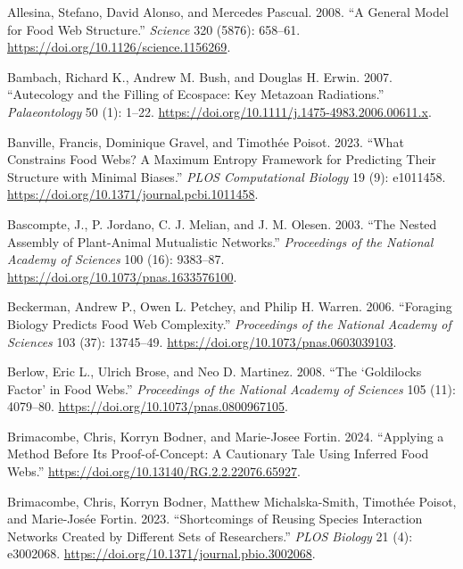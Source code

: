 \documentclass[
  letterpaper,
  DIV=11,
  numbers=noendperiod]{scrartcl}
\newlength{\cslhangindent}
\newenvironment{CSLReferences}[2] %
 {\begin{list}{}{%
  \setlength{\itemindent}{0pt}
  \setlength{\leftmargin}{0pt}
  \setlength{\parsep}{0pt}
  \ifodd #1
   \setlength{\leftmargin}{\cslhangindent}
   \setlength{\itemindent}{-1\cslhangindent}
  \fi
  \setlength{\itemsep}{#2\baselineskip}}}
 {\end{list}}
\begin{document}
\label{refs}
\begin{CSLReferences}{1}{0}
Allesina, Stefano, David Alonso, and Mercedes Pascual. 2008. {``A
{General Model} for {Food Web Structure}.''} \emph{Science} 320 (5876):
658--61. \url{https://doi.org/10.1126/science.1156269}.

Bambach, Richard K., Andrew M. Bush, and Douglas H. Erwin. 2007.
{``Autecology and the {Filling} of {Ecospace}: {Key Metazoan
Radiations}.''} \emph{Palaeontology} 50 (1): 1--22.
\url{https://doi.org/10.1111/j.1475-4983.2006.00611.x}.

Banville, Francis, Dominique Gravel, and Timothée Poisot. 2023. {``What
Constrains Food Webs? {A} Maximum Entropy Framework for Predicting Their
Structure with Minimal Biases.''} \emph{PLOS Computational Biology} 19
(9): e1011458. \url{https://doi.org/10.1371/journal.pcbi.1011458}.

Bascompte, J., P. Jordano, C. J. Melian, and J. M. Olesen. 2003. {``The
Nested Assembly of Plant-Animal Mutualistic Networks.''}
\emph{Proceedings of the National Academy of Sciences} 100 (16):
9383--87. \url{https://doi.org/10.1073/pnas.1633576100}.

Beckerman, Andrew P., Owen L. Petchey, and Philip H. Warren. 2006.
{``Foraging Biology Predicts Food Web Complexity.''} \emph{Proceedings
of the National Academy of Sciences} 103 (37): 13745--49.
\url{https://doi.org/10.1073/pnas.0603039103}.

Berlow, Eric L., Ulrich Brose, and Neo D. Martinez. 2008. {``The
{`{Goldilocks} Factor'} in Food Webs.''} \emph{Proceedings of the
National Academy of Sciences} 105 (11): 4079--80.
\url{https://doi.org/10.1073/pnas.0800967105}.

Brimacombe, Chris, Korryn Bodner, and Marie-Josee Fortin. 2024.
{``Applying a Method Before Its Proof-of-Concept: {A} Cautionary Tale
Using Inferred Food Webs.''}
\url{https://doi.org/10.13140/RG.2.2.22076.65927}.

Brimacombe, Chris, Korryn Bodner, Matthew Michalska-Smith, Timothée
Poisot, and Marie-Josée Fortin. 2023. {``Shortcomings of Reusing Species
Interaction Networks Created by Different Sets of Researchers.''}
\emph{PLOS Biology} 21 (4): e3002068.
\url{https://doi.org/10.1371/journal.pbio.3002068}.


\end{CSLReferences}
\end{document}
